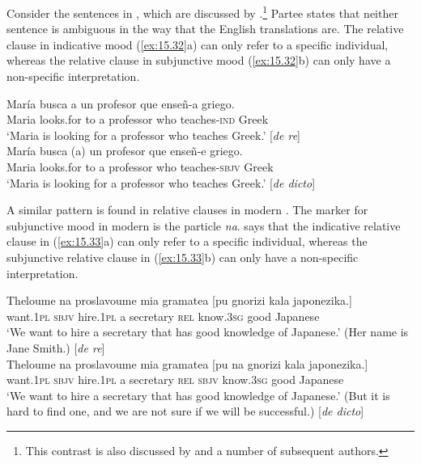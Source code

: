 Consider the  sentences in , which are discussed by \citet{Partee2008}.\footnote{This contrast is also discussed by \citet{Quine1956} and a number of subsequent authors.} Partee states that neither sentence is ambiguous in the way that the English translations are. The relative clause in indicative mood (\ref{ex:15.32}a) can only refer to a specific individual, whereas the relative clause in subjunctive mood (\ref{ex:15.32}b) can only have a non-specific interpretation.

\ea \label{ex:15.32}
\ea  \gll María  busca  a  un  profesor  que  enseñ-a  griego.\\
Maria  looks.for  to  a  professor  who  teaches-\textsc{ind}  {Greek}\\
\glt ‘Maria is looking for a professor who teaches {Greek}.’  \hfill   [\textit{de re}] \\
\medskip
\ex \gll María  busca  (a)  un  profesor  que  enseñ-e  griego.\\
Maria  looks.for  to  a  professor  who  teaches-\textsc{sbjv}  {Greek}\\
\glt ‘Maria is looking for a professor who teaches {Greek}.’  \hfill   [\textit{de dicto}]
\z \z


A similar pattern is found in relative clauses in modern . The marker for subjunctive mood in modern  is the particle \textit{na}. \citet{Giannakidou2011} says that the indicative relative clause in (\ref{ex:15.33}a) can only refer to a specific individual, whereas the subjunctive relative clause in (\ref{ex:15.33}b) can only have a non-specific interpretation.


\ea \label{ex:15.33}
\ea  \gll Theloume  na  proslavoume  mia  gramatea  [pu  gnorizi  kala  japonezika.]\\
want.\textsc{1pl} \textsc{sbjv}  hire.\textsc{1pl} a  secretary  \textsc{rel}  know.\textsc{3sg} good  {Japanese}\\
\glt ‘We want to hire a secretary that has good knowledge of {Japanese}.’ (Her name is Jane Smith.) \hfill  [\textit{de re}] \\
\medskip
\ex \gll  Theloume  na  proslavoume  mia  gramatea [pu  na  gnorizi  kala  japonezika.]\\
want.\textsc{1pl} \textsc{sbjv}  hire.\textsc{1pl} a  secretary \textsc{rel}  \textsc{sbjv}  know.\textsc{3sg} good  {Japanese}\\
\glt ‘We want to hire a secretary that has good knowledge of {Japanese}.’ (But it is hard to find one, and we are not sure if we will be successful.) \hfill  [\textit{de dicto}]\\
\z \z


